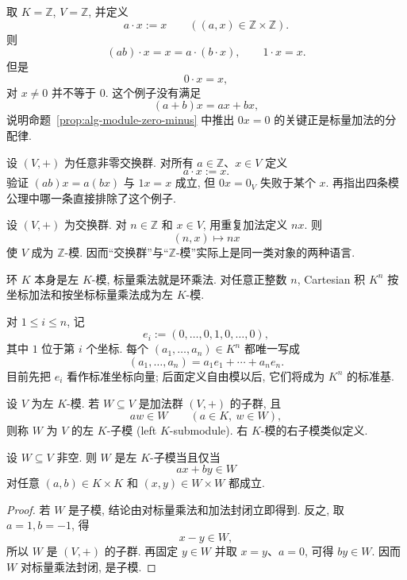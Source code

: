 \documentclass[usesamecnt, thmcnt=section, lang=cn, newtx, 10pt, scheme=chinese]{elegantbook}
\begin{document}
\begin{instance}
取 $K=\mathbb Z$, $V=\mathbb Z$, 并定义
\[
 a\cdot x:=x
 \qquad((a,x)\in\mathbb Z\times\mathbb Z).
\]
则
\[
 (ab)\cdot x=x=a\cdot(b\cdot x),
 \qquad
 1\cdot x=x.
\]
但是
\[
 0\cdot x=x,
\]
对 $x\neq0$ 并不等于 $0$. 这个例子没有满足
\[
 (a+b)x=ax+bx,
\]
说明命题~\ref{prop:alg-module-zero-minus} 中推出 $0x=0$ 的关键正是标量加法的分配律.
\end{instance}

\begin{exercise}\label{ex:alg-module-distributive}
设 $(V,+)$ 为任意非零交换群. 对所有 $a\in\mathbb Z$、$x\in V$ 定义
\[
 a\cdot x:=x.
\]
验证 $(ab)x=a(bx)$ 与 $1x=x$ 成立, 但 $0x=0_V$ 失败于某个 $x$. 再指出四条模公理中哪一条直接排除了这个例子.
\end{exercise}

\begin{instance}
设 $(V,+)$ 为交换群. 对 $n\in\mathbb Z$ 和 $x\in V$, 用重复加法定义 $nx$. 则
\[
 (n,x)\longmapsto nx
\]
使 $V$ 成为 $\mathbb Z$-模. 因而``交换群''与``$\mathbb Z$-模''实际上是同一类对象的两种语言.
\end{instance}

\begin{instance}\label{ins:alg-standard-module}
环 $K$ 本身是左 $K$-模, 标量乘法就是环乘法. 对任意正整数 $n$, Cartesian 积 $K^n$ 按坐标加法和按坐标标量乘法成为左 $K$-模.

对 $1\leq i\leq n$, 记
\[
 e_i:=(0,\ldots,0,1,0,\ldots,0),
\]
其中 $1$ 位于第 $i$ 个坐标. 每个 $(a_1,\ldots,a_n)\in K^n$ 都唯一写成
\[
 (a_1,\ldots,a_n)=a_1e_1+\cdots+a_ne_n.
\]
目前先把 $e_i$ 看作标准坐标向量; 后面定义自由模以后, 它们将成为 $K^n$ 的标准基.
\end{instance}

\begin{definition}[子模]\label{def:alg-submodule-hom}
设 $V$ 为左 $K$-模. 若 $W\subseteq V$ 是加法群 $(V,+)$ 的子群, 且
\[
 aw\in W
 \qquad(a\in K,\ w\in W),
\]
则称 $W$ 为 $V$ 的{\color{blue}左 $K$-子模 (left $K$-submodule)}. 右 $K$-模的右子模类似定义.
\end{definition}

\begin{proposition}\label{prop:alg-submodule-criterion}
设 $W\subseteq V$ 非空. 则 $W$ 是左 $K$-子模当且仅当
\[
 ax+by\in W
\]
对任意 $(a,b)\in K\times K$ 和 $(x,y)\in W\times W$ 都成立.
\end{proposition}

\begin{proof}
若 $W$ 是子模, 结论由对标量乘法和加法封闭立即得到. 反之, 取 $a=1,b=-1$, 得
\[
 x-y\in W,
\]
所以 $W$ 是 $(V,+)$ 的子群. 再固定 $y\in W$ 并取 $x=y$、$a=0$, 可得 $by\in W$. 因而 $W$ 对标量乘法封闭, 是子模.
\end{proof}
\end{document}
